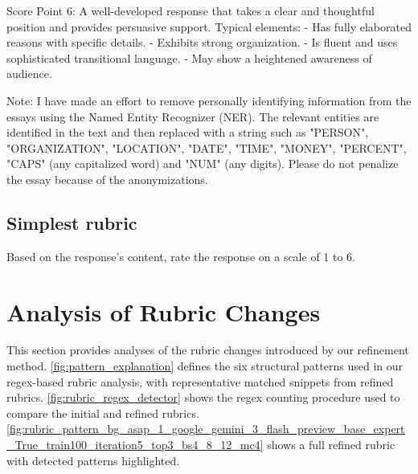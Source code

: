 \documentclass[11pt]{article}
\begin{document}
\begin{tcolorbox}[colback=white, colframe=gray, fontupper=\small, breakable]
Score Point 6: A well-developed response that takes a clear and thoughtful position and provides persuasive support. Typical elements:
- Has fully elaborated reasons with specific details.
- Exhibits strong organization.
- Is fluent and uses sophisticated transitional language.
- May show a heightened awareness of audience.

Note: 
I have made an effort to remove personally identifying information from the essays using the Named Entity Recognizer (NER). The relevant entities are identified in the text and then replaced with a string such as "PERSON", "ORGANIZATION", "LOCATION", "DATE", "TIME", "MONEY", "PERCENT", "CAPS" (any capitalized word) and "NUM" (any digits). Please do not penalize the essay because of the anonymizations.
\end{tcolorbox}

\subsection{Simplest rubric}

\begin{tcolorbox}[colback=white, colframe=gray, fontupper=\small]
Based on the response's content, rate the response on a scale of 1 to 6.
\end{tcolorbox}

\section{Analysis of Rubric Changes}
\label{app:rubric_analysis}
This section provides analyses of the rubric changes introduced by our refinement method. \autoref{fig:pattern_explanation} defines the six structural patterns used in our regex-based rubric analysis, with representative matched snippets from refined rubrics. \autoref{fig:rubric_regex_detector} shows the regex counting procedure used to compare the initial and refined rubrics. \autoref{fig:rubric_pattern_bg_asap_1_google_gemini_3_flash_preview_base_expert_True_train100_iteration5_top3_bs4_8_12_mc4} shows a full refined rubric with detected patterns highlighted.


\end{document}
